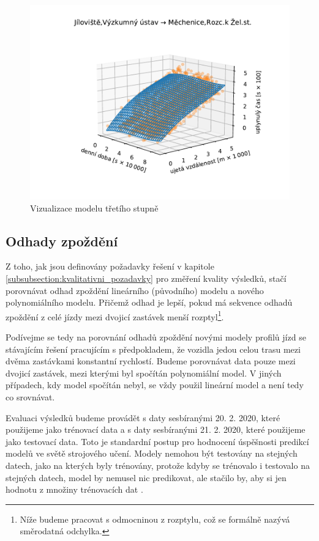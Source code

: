 \begin{figure}
   \centering
 \includegraphics[width=\linewidth]{../img/thrd_degree}
 \caption{Vizualizace modelu třetího stupně}
 \label{fig:thrd_degree}
\end{figure}




\subsection{Odhady zpoždění} \label{subsection:odhady_zpozdeni}


Z toho, jak jsou definovány požadavky řešení v kapitole \ref{subsubsection:kvalitativni_pozadavky} pro změření kvality výsledků, stačí porovnávat odhad zpoždění lineárního (původního) modelu a nového polynomiálního modelu. Přičemž odhad je lepší, pokud má sekvence odhadů zpoždění z celé jízdy mezi dvojicí zastávek menší rozptyl\footnote{Níže budeme pracovat s odmocninou z rozptylu, což se formálně nazývá směrodatná odchylka.}.


\bigbreak


Podívejme se tedy na porovnání odhadů zpoždění novými modely profilů jízd se stávajícím řešení pracujícím s předpokladem, že vozidla jedou celou trasu mezi dvěma zastávkami konstantní rychlostí. Budeme porovnávat data pouze mezi dvojicí zastávek, mezi kterými byl spočítán polynomiální model. V jiných případech, kdy model spočítán nebyl, se vždy použil lineární model a není tedy co srovnávat.


\bigbreak


Evaluaci výsledků budeme provádět s daty sesbíranými 20. 2. 2020, které použijeme jako trénovací data a s daty sesbíranými 21. 2. 2020, které použijeme jako testovací data. Toto je standardní postup pro hodnocení úspěšnosti predikcí modelů ve světě strojového učení. Modely nemohou být testovány na stejných datech, jako na kterých byly trénovány, protože kdyby se trénovalo i testovalo na stejných datech, model by nemusel nic predikovat, ale stačilo by, aby si jen  hodnotu z množiny trénovacích dat \citep[viz][Strana 30]{Gareth13}.



